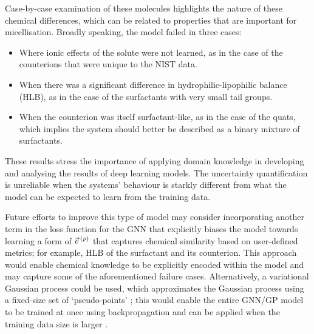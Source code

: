 Case-by-case examination of these molecules highlights the nature of these chemical
differences, which can be related to properties that are important for micellisation.
Broadly speaking, the model failed in three cases:
\begin{itemize}
    \item Where ionic effects of the solute were not learned, as in the case of the counterions that were unique to the NIST data.
    \item When there was a significant difference in hydrophilic-lipophilic balance (HLB), as in the case of the surfactants with very small tail groups.
    \item When the counterion was itself surfactant-like, as in the case of the
          quats, which implies the system should better be described as a binary
          mixture of surfactants.
\end{itemize}
These results stress the importance of applying domain knowledge in developing
and analysing the results of deep learning models. The uncertainty
quantification is unreliable when the systems' behaviour is starkly different
from what the model can be expected to learn from the training data.

Future efforts to improve this type of model may consider incorporating another
term in the loss function for the GNN that explicitly biases the model towards
learning a form of $\vec{v}^{\,(p)}{}$ that captures chemical similarity based on
user-defined metrics; for example, HLB of the surfactant and its counterion.
This approach would enable chemical knowledge to be explicitly encoded within
the model and may capture some of the aforementioned failure cases.
Alternatively, a variational Gaussian process could be used, which approximates
the Gaussian process using a fixed-size set of `pseudo-points'
\cite{hensmanGaussianProcessesBig2013a}; this would enable the entire GNN/GP
model to be trained at once using backpropagation and can be applied when the
training data size is larger
\cite{moriartyUnlockNNUncertaintyQuantification2022}.